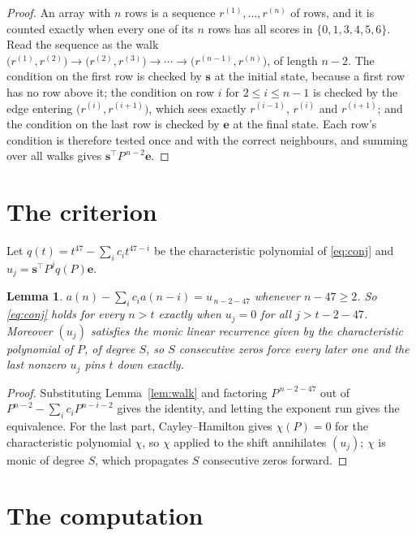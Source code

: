 \documentclass[11pt,a4paper]{article}
\theoremstyle{plain}
\newtheorem{lemma}[theorem]{Lemma}
\theoremstyle{definition}
\begin{document}
\begin{proof}
An array with $n$ rows is a sequence $r^{(1)},\dots,r^{(n)}$ of rows, and it is counted
exactly when every one of its $n$ rows has all scores in $\{0,1,3,4,5,6\}$. Read the sequence as the
walk $\bigl(r^{(1)},r^{(2)}\bigr)\to\bigl(r^{(2)},r^{(3)}\bigr)\to\cdots\to
\bigl(r^{(n-1)},r^{(n)}\bigr)$, of length $n-2$. The condition on the first row is
checked by $\mathbf{s}$ at the initial state, because a first row has no row above it; the
condition on row $i$ for $2\le i\le n-1$ is checked by the edge entering
$\bigl(r^{(i)},r^{(i+1)}\bigr)$, which sees exactly $r^{(i-1)}$, $r^{(i)}$ and
$r^{(i+1)}$; and the condition on the last row is checked by $\mathbf{e}$ at the final
state. Each row's condition is therefore tested once and with the correct neighbours, and
summing over all walks gives $\mathbf{s}^{\!\top}P^{\,n-2}\mathbf{e}$.
\end{proof}

\section{The criterion}

Let $q(t)=t^{47}-\sum_i c_i t^{47-i}$ be the characteristic polynomial of
\eqref{eq:conj} and $u_j=\mathbf{s}^{\!\top}P^{j}q(P)\mathbf{e}$.

\begin{lemma}\label{lem:crit}
$a(n)-\sum_i c_i a(n-i)=u_{\,n-2-47}$ whenever $n-47\ge2$. So \eqref{eq:conj}
holds for every $n>t$ exactly when $u_j=0$ for all $j>t-2-47$. Moreover $(u_j)$
satisfies the monic linear recurrence given by the characteristic polynomial of $P$, of
degree $S$, so $S$ consecutive zeros force every later one and the last nonzero $u_j$ pins
$t$ down exactly.
\end{lemma}

\begin{proof}
Substituting Lemma~\ref{lem:walk} and factoring $P^{\,n-2-47}$ out of
$P^{n-2}-\sum_i c_i P^{n-i-2}$ gives the identity, and letting the exponent run gives the
equivalence. For the last part, Cayley--Hamilton gives $\chi(P)=0$ for the characteristic
polynomial $\chi$, so $\chi$ applied to the shift annihilates $(u_j)$; $\chi$ is monic of
degree $S$, which propagates $S$ consecutive zeros forward.
\end{proof}

\section{The computation}
\end{document}
